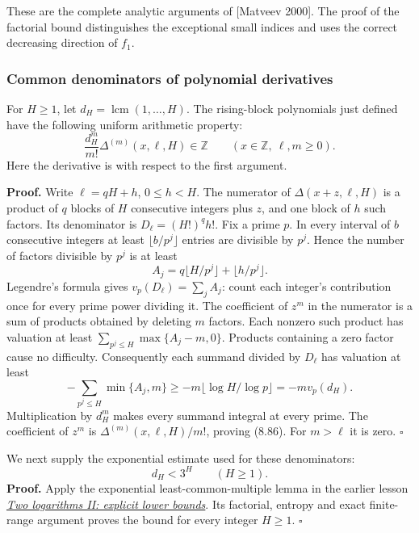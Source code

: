 \documentclass[
  11pt,
  a4paper,
]{article}
\begin{document}
These are the complete analytic arguments of {[}Matveev 2000{]}. The
proof of the factorial bound distinguishes the exceptional small indices
and uses the correct decreasing direction of \(f_1\).

\subsubsection{Common denominators of polynomial
derivatives}\label{common-denominators-of-polynomial-derivatives}

For \(H\ge1\), let \(d_H=\operatorname{lcm}(1,\ldots,H)\). The
rising-block polynomials just defined have the following uniform
arithmetic property: \[
\frac{d_H^m}{m!}\Delta^{(m)}(x,\ell,H)\in\mathbb Z
\qquad(x\in\mathbb Z,\ \ell,m\ge0).
\tag{8.86}
\] Here the derivative is with respect to the first argument.

\textbf{Proof.} Write \(\ell=qH+h\), \(0\le h<H\). The numerator of
\(\Delta(x+z,\ell,H)\) is a product of \(q\) blocks of \(H\) consecutive
integers plus \(z\), and one block of \(h\) such factors. Its
denominator is \(D_\ell=(H!)^q h!\). Fix a prime \(p\). In every
interval of \(b\) consecutive integers at least \(\lfloor b/p^j\rfloor\)
entries are divisible by \(p^j\). Hence the number of factors divisible
by \(p^j\) is at least \[
A_j=q\lfloor H/p^j\rfloor+\lfloor h/p^j\rfloor.
\] Legendre's formula gives \(v_p(D_\ell)=\sum_j A_j\): count each
integer's contribution once for every prime power dividing it. The
coefficient of \(z^m\) in the numerator is a sum of products obtained by
deleting \(m\) factors. Each nonzero such product has valuation at least
\(\sum_{p^j\le H}\max\{A_j-m,0\}\). Products containing a zero factor
cause no difficulty. Consequently each summand divided by \(D_\ell\) has
valuation at least \[
-\sum_{p^j\le H}\min\{A_j,m\}
\ge-m\lfloor\log H/\log p\rfloor=-m v_p(d_H).
\] Multiplication by \(d_H^m\) makes every summand integral at every
prime. The coefficient of \(z^m\) is \(\Delta^{(m)}(x,\ell,H)/m!\),
proving (8.86). For \(m>\ell\) it is zero. \(\square\)

We next supply the exponential estimate used for these denominators: \[
d_H<3^H\qquad(H\ge1).
\tag{8.87}
\] \textbf{Proof.} Apply the exponential least-common-multiple lemma in
the earlier lesson
\href{https://kokunoyumeto.github.io/open-math-courses-public/courses/TR-BAKER/TR-BAKER-07.html\#an-exponential-bound-for-least-common-multiples}{\emph{Two
logarithms II: explicit lower bounds}}. Its factorial, entropy and exact
finite-range argument proves the bound for every integer \(H\ge1\).
\(\square\)
\end{document}
